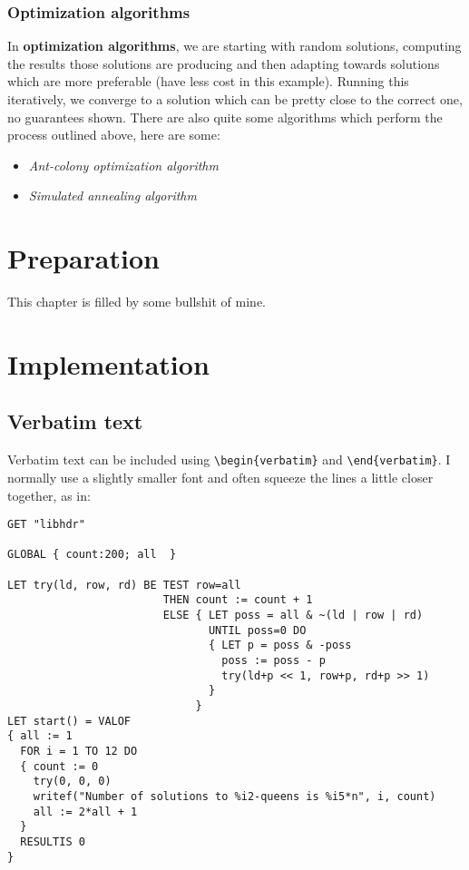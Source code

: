 \documentclass[12pt,twoside,notitlepage]{report}
\renewcommand{\baselinestretch}{1.1}    %
\begin{document}
\subsection{Optimization algorithms}

In {\bf optimization algorithms}, we are starting with random solutions, computing the results those solutions are producing and then adapting towards solutions which are more preferable (have less cost in this example). Running this iteratively, we converge to a solution which can be pretty close to the correct one, no guarantees shown. There are also quite some algorithms which perform the process outlined above, here are some:

\begin{itemize}

\item {\it Ant-colony optimization algorithm}
\item {\it Simulated annealing algorithm}

\end{itemize}

\cleardoublepage



\chapter{Preparation}

This chapter is filled by some bullshit of mine.


\cleardoublepage
\chapter{Implementation}

\section{Verbatim text}

Verbatim text can be included using \verb|\begin{verbatim}| and
\verb|\end{verbatim}|. I normally use a slightly smaller font and
often squeeze the lines a little closer together, as in:

{\renewcommand{\baselinestretch}{0.8}\small\begin{verbatim}
GET "libhdr"
 
GLOBAL { count:200; all  }
 
LET try(ld, row, rd) BE TEST row=all
                        THEN count := count + 1
                        ELSE { LET poss = all & ~(ld | row | rd)
                               UNTIL poss=0 DO
                               { LET p = poss & -poss
                                 poss := poss - p
                                 try(ld+p << 1, row+p, rd+p >> 1)
                               }
                             }
LET start() = VALOF
{ all := 1
  FOR i = 1 TO 12 DO
  { count := 0
    try(0, 0, 0)
    writef("Number of solutions to %i2-queens is %i5*n", i, count)
    all := 2*all + 1
  }
  RESULTIS 0
}
\end{verbatim}
}
\end{document}
